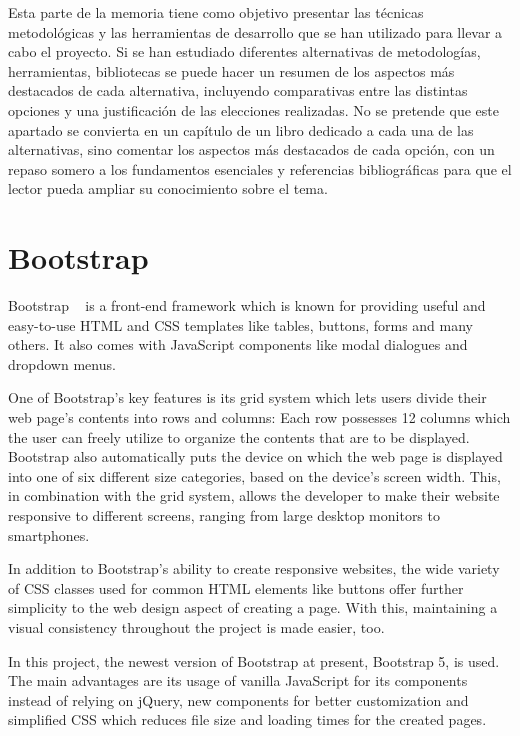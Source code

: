 
Esta parte de la memoria tiene como objetivo presentar las técnicas metodológicas y las herramientas de desarrollo que se han utilizado para llevar a cabo el proyecto. Si se han estudiado diferentes alternativas de metodologías, herramientas, bibliotecas se puede hacer un resumen de los aspectos más destacados de cada alternativa, incluyendo comparativas entre las distintas opciones y una justificación de las elecciones realizadas. 
No se pretende que este apartado se convierta en un capítulo de un libro dedicado a cada una de las alternativas, sino comentar los aspectos más destacados de cada opción, con un repaso somero a los fundamentos esenciales y referencias bibliográficas para que el lector pueda ampliar su conocimiento sobre el tema.

\section{Bootstrap}
Bootstrap ~\cite{bootstrap5_tutorial} is a front-end framework which is known for providing useful and easy-to-use HTML and CSS templates like tables, buttons, forms and many others. It also comes with JavaScript components like modal dialogues and dropdown menus.

One of Bootstrap's key features is its grid system which lets users divide their web page's contents into rows and columns:
Each row possesses 12 columns which the user can freely utilize to organize the contents that are to be displayed. Bootstrap also automatically puts the device on which the web page is displayed into one of six different size categories, based on the device's screen width. This, in combination with the grid system, allows the developer to make their website responsive to different screens, ranging from large desktop monitors to smartphones.

In addition to Bootstrap's ability to create responsive websites, the wide variety of CSS classes used for common HTML elements like buttons offer further simplicity to the web design aspect of creating a page. With this, maintaining a visual consistency throughout the project is made easier, too.

In this project, the newest version of Bootstrap at present, Bootstrap 5, is used. The main advantages are its usage of vanilla JavaScript for its components instead of relying on jQuery, new components for better customization and simplified CSS which reduces file size and loading times for the created pages.

